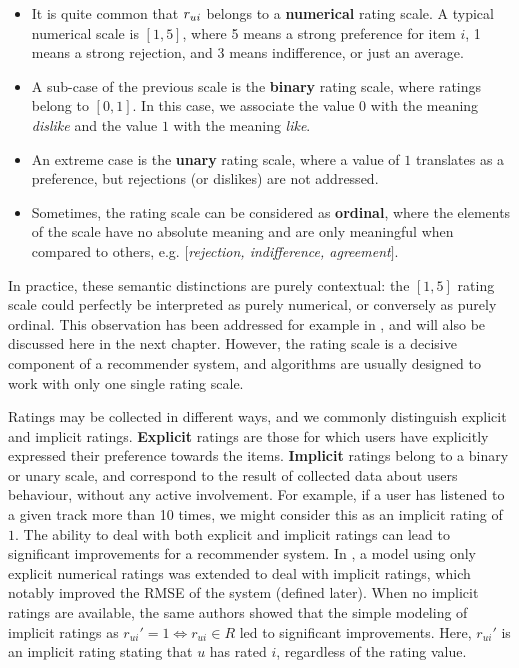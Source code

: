 \begin{itemize}
  \item It is quite common that  $r_{ui}$ belongs to a \textbf{numerical} rating
    scale. A typical numerical scale is $[1, 5]$, where  5 means a strong
    preference for item $i$, 1 means a strong rejection, and 3 means
    indifference, or just an average.
  \item A sub-case of the previous scale is the \textbf{binary} rating scale,
    where ratings belong to $[0, 1]$. In this case, we associate the value $0$
    with the meaning \textit{dislike} and the value $1$ with the meaning
    \textit{like}.
  \item An extreme case is the \textbf{unary} rating scale, where a value of
    $1$ translates as a preference, but rejections (or dislikes) are not
    addressed.
  \item Sometimes, the rating scale can be considered as \textbf{ordinal},
    where the elements of the scale have no absolute meaning and are only
    meaningful when compared to others, e.g. $[$\textit{rejection, indifference,
    agreement}$]$.
\end{itemize}
In practice, these semantic distinctions are purely contextual: the
$[1, 5]$ rating scale could perfectly be interpreted as purely numerical,
or conversely as purely ordinal. This observation has been addressed for
example in \cite{KorSillRECSYS11}, and will also be discussed here in the next
chapter. However, the rating scale is a decisive component of a recommender
system, and algorithms are usually designed to work with only one single rating
scale.

Ratings may be collected in different ways, and we commonly distinguish explicit and
implicit ratings. \textbf{Explicit} ratings are those for which users have
explicitly expressed their preference towards the items. \textbf{Implicit}
ratings belong to a binary or unary scale, and correspond to the result of
collected data about users behaviour, without any active involvement. For
example, if a user has listened to a given track more than 10 times, we might
consider this as an implicit rating of $1$. The ability to deal with both
explicit and implicit ratings can lead to significant improvements for a
recommender system. In \cite{KorSillRECSYS11}, a model using only explicit
numerical ratings was extended to deal with implicit ratings, which notably improved
the RMSE of the system (defined later). When no implicit
ratings are available, the same authors showed that the simple modeling of
implicit ratings as $r_{ui}' = 1 \iff r_{ui} \in R$ led to significant
improvements. Here, $r_{ui}'$ is an implicit rating stating that $u$ has rated
$i$, regardless of the rating value.

